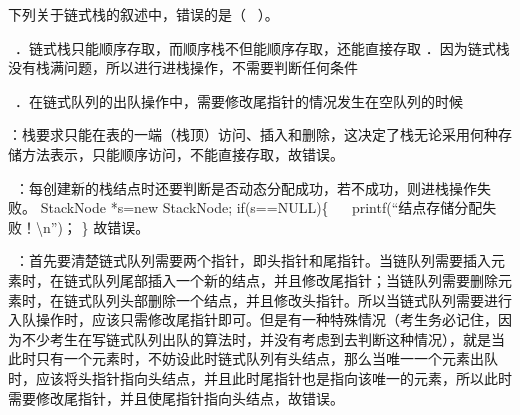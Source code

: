 \question 下列关于链式栈的叙述中，错误的是（ ~）。

~．链式栈只能顺序存取，而顺序栈不但能顺序存取，还能直接存取
．因为链式栈没有栈满问题，所以进行进栈操作，不需要判断任何条件

~．在链式队列的出队操作中，需要修改尾指针的情况发生在空队列的时候
\par{}
\begin{solution}：栈要求只能在表的一端（栈顶）访问、插入和删除，这决定了栈无论采用何种存储方法表示，只能顺序访问，不能直接存取，故错误。

~：每创建新的栈结点时还要判断是否动态分配成功，若不成功，则进栈操作失败。
StackNode *s=new StackNode; if(s==NULL)\{ ~
~printf(``结点存储分配失败！\textbackslash{}n'')； \} 故错误。

~：首先要清楚链式队列需要两个指针，即头指针和尾指针。当链队列需要插入元素时，在链式队列尾部插入一个新的结点，并且修改尾指针；当链队列需要删除元素时，在链式队列头部删除一个结点，并且修改头指针。所以当链式队列需要进行入队操作时，应该只需修改尾指针即可。但是有一种特殊情况（考生务必记住，因为不少考生在写链式队列出队的算法时，并没有考虑到去判断这种情况），就是当此时只有一个元素时，不妨设此时链式队列有头结点，那么当唯一一个元素出队时，应该将头指针指向头结点，并且此时尾指针也是指向该唯一的元素，所以此时需要修改尾指针，并且使尾指针指向头结点，故错误。
\end{solution}
